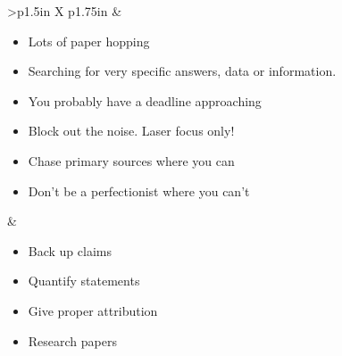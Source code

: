 \documentclass[8pt]{extarticle}
\begin{document}
\begin{tabularx}{\linewidth}{>{\bfseries}p{1.5in} X p{1.75in}}
            &   \begin{minipage}[t]{\linewidth}
                    \vspace{0pt}

                    \begin{whatBox}
                    \begin{itemize}[nosep,leftmargin=*]
                        \item Lots of paper hopping
                        \item Searching for very specific answers, data or information.
                    \end{itemize}
                    \end{whatBox}

                    \begin{tipsBox}
                    \begin{itemize}[nosep,leftmargin=*]
                        \item You probably have a deadline approaching
                        \item Block out the noise. Laser focus only!
                        \item Chase primary sources where you can
                        \item Don't be a perfectionist where you can't
                    \end{itemize}
                    \end{tipsBox}
                \end{minipage}

                    &   \begin{minipage}[t]{\linewidth}
                            \vspace{0pt}

                            \begin{whenBox}
                            \begin{itemize}[nosep,leftmargin=*]
                                \item Back up claims
                                \item Quantify statements
                                \item Give proper attribution
                            \end{itemize}
                            \end{whenBox}

                            \begin{sourcesBox}
                            \begin{itemize}[nosep,leftmargin=*]
                                \item Research papers
                            \end{itemize}
                            \end{sourcesBox}
                        \end{minipage}

                            \\
\end{tabularx}
\end{document}

